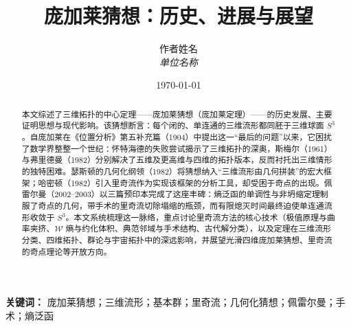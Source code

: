 \documentclass[12pt,a4paper]{article}
\title{庞加莱猜想：历史、进展与展望}
\author{
    作者姓名\\
    \textit{单位名称}
}
\date{\today}
\numberwithin{equation}{section}
\begin{document}
\maketitle

\begin{abstract}
    本文综述了三维拓扑的中心定理——庞加莱猜想（庞加莱定理）——的历史发展、主要证明思想与现代影响。该猜想断言：每个闭的、单连通的三维流形都同胚于三维球面 $S^3$。自庞加莱在《位置分析》第五补充篇（1904）中提出这一“最后的问题”以来，它困扰了数学界整整一个世纪：怀特海德的失败尝试揭示了三维拓扑的深奥，斯梅尔（1961）与弗里德曼（1982）分别解决了五维及更高维与四维的拓扑版本，反而衬托出三维情形的独特困难。瑟斯顿的几何化纲领（1982）将猜想纳入“三维流形由几何拼装”的宏大框架；哈密顿（1982）引入里奇流作为实现该框架的分析工具，却受困于奇点的出现。佩雷尔曼（2002--2003）以三篇预印本完成了这座丰碑：熵泛函的单调性与非坍缩定理制服了奇点的几何，带手术的里奇流切除塌缩的瓶颈，而有限熄灭时间最终迫使单连通流形收敛于 $S^3$。本文系统梳理这一脉络，重点讨论里奇流方法的核心技术（极值原理与曲率夹挤、$\mathcal{W}$ 熵与约化体积、典范邻域与手术结构、古代解分类），以及定理在三维流形分类、四维拓扑、群论与宇宙拓扑中的深远影响，并展望光滑四维庞加莱猜想、里奇流的奇点理论等开放方向。
\end{abstract}

\textbf{关键词：} 庞加莱猜想；三维流形；基本群；里奇流；几何化猜想；佩雷尔曼；手术；熵泛函

\tableofcontents
\newpage












\appendix

\end{document}
